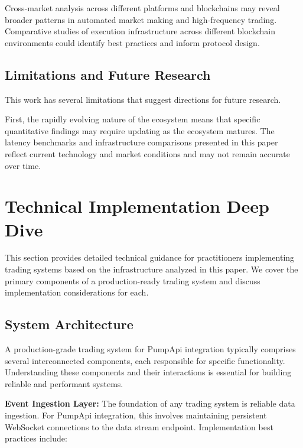 \documentclass[12pt,a4paper]{article}
\begin{document}
Cross-market analysis across different platforms and blockchains may reveal broader patterns in automated market making and high-frequency trading. Comparative studies of execution infrastructure across different blockchain environments could identify best practices and inform protocol design.

\subsection{Limitations and Future Research}

This work has several limitations that suggest directions for future research.

First, the rapidly evolving nature of the ecosystem means that specific quantitative findings may require updating as the ecosystem matures. The latency benchmarks and infrastructure comparisons presented in this paper reflect current technology and market conditions and may not remain accurate over time.

\section{Technical Implementation Deep Dive}

This section provides detailed technical guidance for practitioners implementing trading systems based on the infrastructure analyzed in this paper. We cover the primary components of a production-ready trading system and discuss implementation considerations for each.

\subsection{System Architecture}

A production-grade trading system for PumpApi integration typically comprises several interconnected components, each responsible for specific functionality. Understanding these components and their interactions is essential for building reliable and performant systems.

\textbf{Event Ingestion Layer:} The foundation of any trading system is reliable data ingestion. For PumpApi integration, this involves maintaining persistent WebSocket connections to the data stream endpoint. Implementation best practices include:
\end{document}
